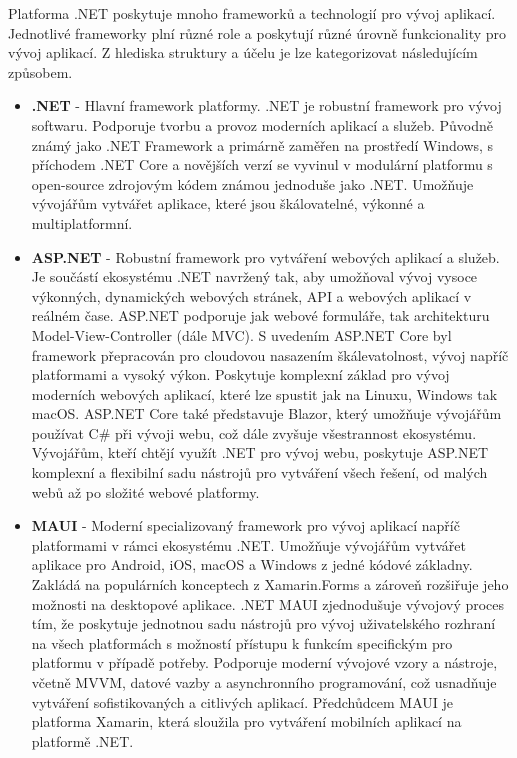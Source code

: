 
Platforma .NET poskytuje mnoho frameworků a technologií pro vývoj aplikací. Jednotlivé frameworky plní různé role a poskytují různé úrovně funkcionality pro vývoj aplikací. Z hlediska struktury a účelu je lze kategorizovat následujícím způsobem. \cite{Price2023c8}

\begin{itemize}
    \item \textbf{.NET} - Hlavní framework platformy. .NET je robustní framework pro vývoj softwaru. Podporuje tvorbu a provoz moderních aplikací a služeb. \cite{Price2023c8} Původně známý jako .NET Framework a primárně zaměřen na prostředí Windows, s příchodem .NET Core a novějších verzí se vyvinul v modulární platformu s open-source zdrojovým kódem známou jednoduše jako .NET. Umožňuje vývojářům vytvářet aplikace, které jsou škálovatelné, výkonné a multiplatformní.
    \item \textbf{ASP.NET} - Robustní framework pro vytváření webových aplikací a služeb. Je součástí ekosystému .NET navržený tak, aby umožňoval vývoj vysoce výkonných, dynamických webových stránek, API a webových aplikací v reálném čase. \cite{Danylko2023} ASP.NET podporuje jak webové formuláře, tak architekturu Model-View-Controller (dále MVC). S uvedením ASP.NET Core byl framework přepracován pro cloudovou nasazením škálevatolnost, vývoj napříč platformami a vysoký výkon. Poskytuje komplexní základ pro vývoj moderních webových aplikací, které lze spustit jak na Linuxu, Windows tak macOS. ASP.NET Core také představuje Blazor, který umožňuje vývojářům používat C\# při vývoji webu, což dále zvyšuje všestrannost ekosystému. \cite{aspnetdocs} Vývojářům, kteří chtějí využít .NET pro vývoj webu, poskytuje ASP.NET komplexní a flexibilní sadu nástrojů pro vytváření všech řešení, od malých webů až po složité webové platformy. 
    \item \textbf{MAUI} - Moderní specializovaný framework pro vývoj aplikací napříč platformami v rámci ekosystému .NET. Umožňuje vývojářům vytvářet aplikace pro Android, iOS, macOS a Windows z jedné kódové základny. Zakládá na populárních konceptech z Xamarin.Forms a zároveň rozšiřuje jeho možnosti na desktopové aplikace. .NET MAUI zjednodušuje vývojový proces tím, že poskytuje jednotnou sadu nástrojů pro vývoj uživatelského rozhraní na všech platformách s možností přístupu k funkcím specifickým pro platformu v případě potřeby. \cite{Libery2023} Podporuje moderní vývojové vzory a nástroje, včetně MVVM, datové vazby a asynchronního programování, což usnadňuje vytváření sofistikovaných a citlivých aplikací. Předchůdcem MAUI je platforma Xamarin, která sloužila pro vytváření mobilních aplikací na platformě .NET. 

\end{itemize}
